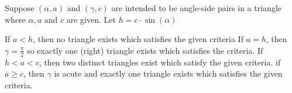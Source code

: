 \documentclass[tikz, border=10pt]{standalone}
\begin{document}
    
Suppose $(\alpha, a)$ and $(\gamma, c)$ are intended to be angle-side pairs in a triangle where $\alpha, a$ and $c$ are given. Let $h = c \cdot \sin(\alpha)$
    
        If $a < h$, then no triangle exists which satisfies the given criteria 
        If $a = h$, then $\gamma = \frac{\pi}{2}$ so exactly one (right) triangle exists which satisfies the criteria.
        If $h < a < c$, then two distinct triangles exist which satisfy the given criteria.
        if $a \geq c$, then $\gamma$ is acute and exactly one triangle exists which satisfies the given criteria.
\end{document}
